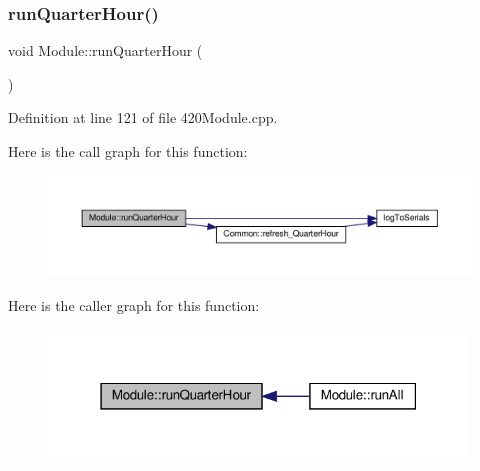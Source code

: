 \mbox{\label{class_module_af56e1160074693aaa5699fafaae9d8be}} 
\subsubsection{\texorpdfstring{run\+Quarter\+Hour()}{runQuarterHour()}\hspace{0.1cm}{\footnotesize\ttfamily [2/2]}}
{\footnotesize\ttfamily void Module\+::run\+Quarter\+Hour (\begin{DoxyParamCaption}{ }\end{DoxyParamCaption})}



Definition at line 121 of file 420\+Module.\+cpp.

Here is the call graph for this function\+:
\nopagebreak
\begin{figure}[H]
\begin{center}
\leavevmode
\includegraphics[width=350pt]{class_module_af56e1160074693aaa5699fafaae9d8be_cgraph}
\end{center}
\end{figure}
Here is the caller graph for this function\+:
\nopagebreak
\begin{figure}[H]
\begin{center}
\leavevmode
\includegraphics[width=316pt]{class_module_af56e1160074693aaa5699fafaae9d8be_icgraph}
\end{center}
\end{figure}
\mbox{\label{class_module_ab66ea27e8ca0041539f6a563b455ab70}} 
